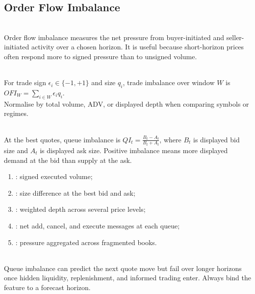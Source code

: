 \subsection{Order Flow Imbalance}

\begin{definition} \\
Order flow imbalance measures the net pressure from buyer-initiated and seller-initiated activity over a chosen horizon. It is useful because short-horizon prices often respond more to signed pressure than to unsigned volume.
\end{definition}

\begin{model} \\
For trade sign $\epsilon_i\in\{-1,+1\}$ and size $q_i$, trade imbalance over window $W$ is $OFI_W=\sum\limits_{i\in W}\epsilon_i q_i$.\\
Normalise by total volume, ADV, or displayed depth when comparing symbols or regimes.
\end{model}

\begin{model} \\
At the best quotes, queue imbalance is $QI_t=\frac{B_t-A_t}{B_t+A_t}$, where $B_t$ is displayed bid size and $A_t$ is displayed ask size. Positive imbalance means more displayed demand at the bid than supply at the ask.
\end{model}

\begin{taxonomy} 
\begin{enumerate}[label=\roman*.]
\setlength{\itemsep}{0pt}
\item {}: signed executed volume;
\item {}: size difference at the best bid and ask;
\item {}: weighted depth across several price levels;
\item {}: net add, cancel, and execute messages at each queue;
\item {}: pressure aggregated across fragmented books.
\end{enumerate}
\end{taxonomy}

\begin{caveat} \\
Queue imbalance can predict the next quote move but fail over longer horizons once hidden liquidity, replenishment, and informed trading enter. Always bind the feature to a forecast horizon.
\end{caveat}
